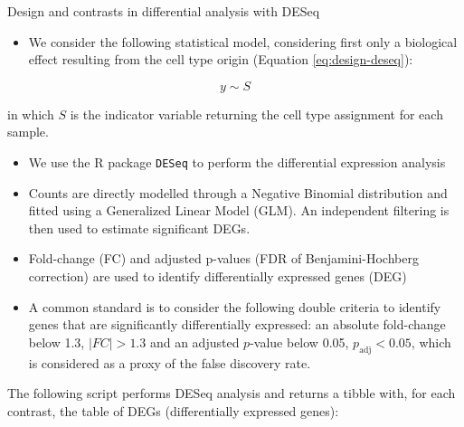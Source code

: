 \begin{info}{Design and contrasts in differential analysis with DESeq}

\begin{itemize}

\item
  We consider the following statistical model, considering first only a biological effect resulting from the cell type origin (Equation \eqref{eq:design-deseq}):
\end{itemize}

\begin{equation}
y \sim S
\label{eq:design-deseq}
\end{equation}

in which \(S\) is the indicator variable returning the cell type assignment for each sample.

\begin{itemize}
\item
  We use the R package \texttt{DESeq} to perform the differential expression analysis
\item
  Counts are directly modelled through a Negative Binomial distribution and fitted using a Generalized Linear Model (GLM). An independent filtering is then used to estimate significant DEGs.
\item
  Fold-change (FC) and adjusted p-values (FDR of Benjamini-Hochberg correction) are used to identify differentially expressed genes (DEG)
\item
  A common standard is to consider the following double criteria to identify genes that are significantly differentially expressed: an absolute fold-change below 1.3, \(|FC| > 1.3\) and an adjusted \(p\)-value below 0.05, \(p_\text{adj} < 0.05\), which is considered as a proxy of the false discovery rate.
\end{itemize}

\end{info}

The following script performs DESeq analysis and returns a tibble with, for each contrast, the table of DEGs (differentially expressed genes):

